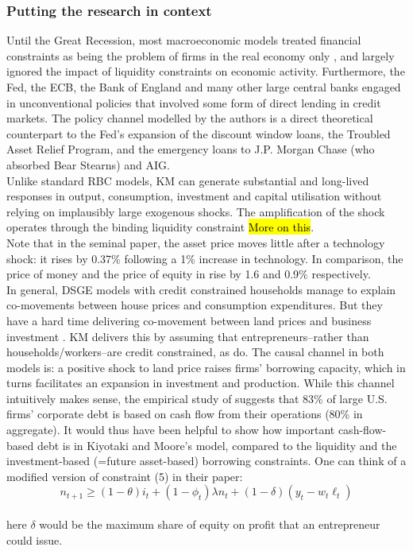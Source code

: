 \documentclass{amsart}
\theoremstyle{definition}
\theoremstyle{remark}
\numberwithin{equation}{section}
\begin{document}
\subsubsection{Putting the research in context} Until the Great Recession, most macroeconomic models treated financial constraints as being the problem of firms in the real economy only \citep{gertler2010financial}, and largely ignored the impact of liquidity constraints on economic activity. Furthermore, the Fed, the ECB, the Bank of England and many other large central banks engaged in unconventional policies that involved some form of direct lending in credit markets. The policy channel modelled by the authors is a direct theoretical counterpart to the Fed's expansion of the discount window loans, the Troubled Asset Relief Program, and the emergency loans to J.P. Morgan Chase (who absorbed Bear Stearns) and AIG.\\

Unlike standard RBC models, KM can generate substantial and long-lived responses in output, consumption, investment and capital utilisation without relying on implausibly large exogenous shocks. The amplification of the shock operates through the binding liquidity constraint \hl{More on this}.\\

Note that in the seminal \cite{kiyotaki1997credit} paper, the asset price moves little after a technology shock: it rises by 0.37\% following a 1\% increase in technology. In comparison, the price of money and the price of equity in \cite{kiyotaki2019liquidity} rise by 1.6 and 0.9\% respectively.\\

In general, DSGE models with credit constrained households manage to explain co-movements between house prices and consumption expenditures. But they have a hard time delivering co-movement between land prices and business investment \citep{iacoviello2010housing}. KM delivers this by assuming that entrepreneurs--rather than households/workers--are credit constrained, as \cite{liu2013land} do. The causal channel in both models is: a positive shock to land price raises firms' borrowing capacity, which in turns facilitates an expansion in investment and production. While this channel intuitively makes sense, the empirical study of \cite{lian2019anatomy} suggests that 83\% of large U.S. firms' corporate debt is based on cash flow from their operations (80\% in aggregate). It would thus have been helpful to show how important cash-flow-based debt is in Kiyotaki and Moore's model, compared to the liquidity and the investment-based (=future asset-based) borrowing constraints. One can think of a modified version of constraint (5) in their paper: $$n_{t+1} \geq(1-\theta) i_{t}+\left(1-\phi_{t}\right) \lambda n_{t} + (1-\delta)(y_t - w_t \ell_t) $$  \\
here $\delta$ would be the maximum share of equity on profit that an entrepreneur could issue.\\
\end{document}
